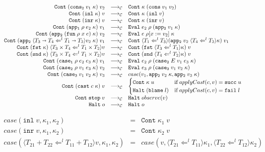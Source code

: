 \documentclass[acmsmall,review,anonymous]{acmart}\settopmatter{printfolios=true,printccs=false,printacmref=false}
\newcommand{\funrule}[3]{#1 &=& #2 & #3\\}
\newcommand{\plus}[0]{+}
\newcommand{\sOOinspect}[3]{\mathtt{Eval} \; #1 \; #2 \; #3}
\newcommand{\sOOreturn}[2]{\mathtt{Cont} \; #2 \; #1}
\newcommand{\sOOhalt}[1]{\mathtt{Halt} \; #1}
\newcommand{\POOfun}[2]{#1 \shortrightarrow #2}
\newcommand{\POOprod}[2]{#1 \times #2}
\newcommand{\POOsum}[2]{#1 \plus #2}
\newcommand{\oOOblame}[1]{\mathtt{blame} \; #1}
\newcommand{\cOOcast}[3]{#3 \Leftarrow^{#2} #1}
\newcommand{\vOOcast}[2]{\langle#2\rangle#1}
\newcommand{\vOOfun}[3]{\mathtt{fun} \; #1 \; #2 \; #3}
\newcommand{\vOOcons}[2]{\mathtt{cons}\;#1\;#2}
\newcommand{\vOOinl}[1]{\mathtt{inl}\;#1}
\newcommand{\vOOinr}[1]{\mathtt{inr}\;#1}
\newcommand{\rOOsucc}[1]{\mathtt{succ}\;#1}
\newcommand{\rOOfail}[1]{\mathtt{fail}\;#1}
\newcommand{\kOOmt}[0]{\mathtt{stop}}
\newcommand{\kOOconsII}[2]{\mathtt{cons_2} \; #1 \; #2}
\newcommand{\kOOinl}[1]{\mathtt{inl} \; #1}
\newcommand{\kOOinr}[1]{\mathtt{inr} \; #1}
\newcommand{\kOOappI}[3]{
	\mathtt{app_1} \; #1 \; #2 \; #3
}
\newcommand{\kOOappII}[2]{
	\mathtt{app_2} \; #1 \; #2}
\newcommand{\kOOcaseI}[4]{
	\mathtt{case_1} \; #1 \; #2 \; #3 \; #4}
\newcommand{\kOOcaseII}[4]{
	\mathtt{case_2} \; #1 \; #2 \; #3 \; #4}
\newcommand{\kOOcaseIII}[3]{
	\mathtt{case_3} \; #1 \; #2 \; #3}
\newcommand{\sidecond}[1]{\text{if}\;#1}
\newcommand{\redrule}[3]{#1 & \longrightarrow_\mathcal{C} & #2 & #3\\}
\begin{document}
\begin{figure}
\[\begin{array}{rclr}
\redrule{
\sOOreturn{v_2}{(\kOOconsII{v_1}{\kappa})}}{
\sOOreturn{(\vOOcons{v_1}{v_2})}{\kappa}}{}

\redrule{
\sOOreturn{v}{(\kOOinl{\kappa})}}{
\sOOreturn{(\vOOinl{v})}{\kappa}}{}

\redrule{
\sOOreturn{v}{(\kOOinr{\kappa})}}{
\sOOreturn{(\vOOinr{v})}{\kappa}}{}

\redrule{
\sOOreturn{v_1}{(\kOOappI{\rho}{e_2}{\kappa})}}{
\sOOinspect{e_2}{\rho}{(\kOOappII{v_1}{\kappa})}}{}

\redrule{
\sOOreturn{v_2}{(\kOOappII{(\vOOfun{\rho}{x}{e})}{\kappa})}}{
\sOOinspect{e}{\rho[x:=v_2]}{\kappa}}{}
	\redrule{
		\sOOreturn{v_1}{(\mathtt{app_2} \; \vOOcast{v_2}{
				\cOOcast{\POOfun{T_1}{T_2}}{l}{\POOfun{T_3}{T_4}}
			} \; \kappa)}
	}{
		\sOOreturn{v_1}{
			\langle\cOOcast{T_3}{l}{T_1}\rangle
			(\mathtt{app_2} \; v_2 \; 
			\langle\cOOcast{T_2}{l}{T_4}\rangle \kappa)}
	}{}
	\redrule{
		\sOOreturn{
			\vOOcast{v}{\cOOcast{\POOprod{T_1}{T_2}}{l}{
					\POOprod{T_3}{T_4}}}
		}{(\mathtt{fst} \; \kappa)}
	}{
		\sOOreturn{v}{(
			\mathtt{fst} \;
			\langle \cOOcast{T_1}{l}{T_3} \rangle \kappa
			)}
	}{}
	
	\redrule{
		\sOOreturn{
			\vOOcast{v}{\cOOcast{\POOprod{T_1}{T_2}}{l}{
					\POOprod{T_3}{T_4}}}
		}{(\mathtt{snd} \; \kappa)}
	}{
		\sOOreturn{v}{(
			\mathtt{snd} \;
			\langle \cOOcast{T_2}{l}{T_4} \rangle \kappa
			)}
	}{}

\redrule{
\sOOreturn{v_1}{(\kOOcaseI{\rho}{e_2}{e_3}{\kappa})}}{
\sOOinspect{e_2}{\rho}{(\kOOcaseII{E}{v_1}{e_3}{\kappa})}}{}

\redrule{
\sOOreturn{v_2}{(\kOOcaseII{\rho}{v_1}{e_3}{\kappa})}}{
\sOOinspect{e_3}{\rho}{
	(\kOOcaseIII{v_1}{v_2}{\kappa})
}}{}	
		\redrule{
		\sOOreturn{v_3}{(
			\mathtt{case_3} \;
			v_1 \; v_2 \;
			\kappa
			)}
	}{case(v_1,
		\mathtt{app_2} \; v_2 \; \kappa,
		\mathtt{app_2} \; v_3 \; \kappa
		)}{}
	
	\redrule{
		\sOOreturn{v}{(
			\mathtt{cast} \; c \; \kappa
			)}
	}{
\begin{cases}
	\sOOreturn{u}{\kappa} & \sidecond{applyCast(c,v) = \rOOsucc{u}}
	\\
	\sOOhalt{(\oOOblame{l})} & \sidecond{applyCast(c,v) = \rOOfail{l}}
\end{cases}
	}{}
\redrule{
\sOOreturn{v}{\kOOmt}}{
\sOOhalt{observe(v)}}{}

\redrule{
\sOOhalt{o}}{
\sOOhalt{o}}{}
	\end{array}
	\]	
	
	\[
	\begin{array}{rclr}
	\funrule{case(\vOOinl{v},\kappa_1,\kappa_2)}{
		\sOOreturn{v}{\kappa_1}
	}{}
	\funrule{case(\vOOinr{v},\kappa_1,\kappa_2)}{
		\sOOreturn{v}{\kappa_2}
	}{}
	\funrule{case(\vOOcast{v}{\cOOcast{\POOsum{T_{11}}{T_{12}}}{l}{\POOsum{T_{21}}{T_{22}}}},\kappa_1,\kappa_2)}{
		case(v,
		\langle \cOOcast{T_{11}}{l}{T_{21}} \rangle \kappa_1,
		\langle \cOOcast{T_{12}}{l}{T_{22}} \rangle \kappa_2)
	}{}
	\end{array}
	\]
		

\end{figure}
\end{document}
